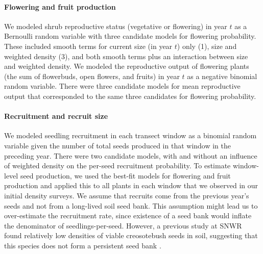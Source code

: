 \documentclass[11pt]{article}\usepackage[]{graphicx}\usepackage[usenames,dvipsnames]{xcolor}
\begin{document}

\paragraph{Flowering and fruit production}
We modeled shrub reproductive status (vegetative or flowering) in year $t$ as a Bernoulli random variable with three candidate models for flowering probability.
These included smooth terms for current size (in year $t$) only (1), size and weighted density (3), and both smooth terms plus an interaction between size and weighted density. 
We modeled the reproductive output of flowering plants (the sum of flowerbuds, open flowers, and fruits) in year $t$ as a negative binomial random variable. 
There were three candidate models for mean reproductive output that corresponded to the same three candidates for flowering probability. 

\paragraph{Recruitment and recruit size}
We modeled seedling recruitment in each transect window as a binomial random variable given the number of total seeds produced in that window in the preceding year. 
There were two candidate models, with and without an influence of weighted density on the per-seed recruitment probability. 
To estimate window-level seed production, we used the best-fit models for flowering and fruit production and applied this to all plants in each window that we observed in our initial density surveys. 
We assume that recruits come from the previous year's seeds and not from a long-lived soil seed bank. 
This assumption might lead us to over-estimate the recruitment rate, since existence of a seed bank would inflate the denominator of seedlings-per-seed.
However, a previous study at SNWR found relatively low densities of viable creosotebush seeds in soil, suggesting that this species does not form a persistent seed bank \citep{moreno2016seed}.
\end{document}
